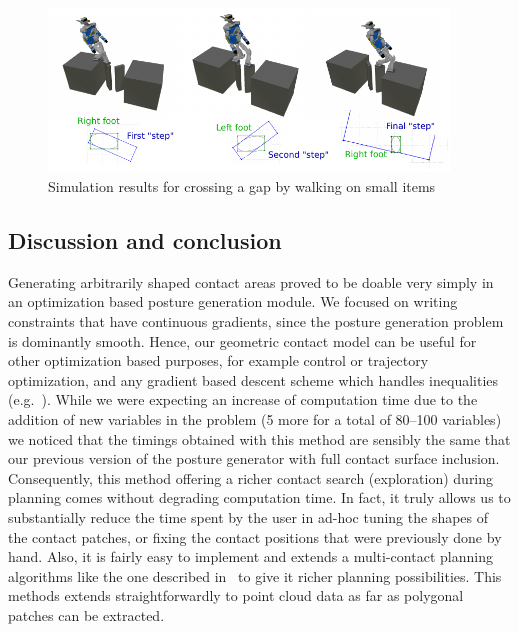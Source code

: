 \begin{figure}[!htb]
  \centering
  \includegraphics[width=0.95\textwidth]{riviere3steps.pdf}
  \caption{Simulation results for crossing a gap by walking on small items}
\label{fig:riviere}
\end{figure}



\subsection{Discussion and conclusion}


Generating arbitrarily shaped contact areas proved to be doable very simply in an optimization based posture generation module.
We focused on writing constraints that have continuous gradients, since the posture generation problem is dominantly smooth.
Hence, our geometric contact model can be useful for other optimization based purposes, for example control or trajectory optimization, and any gradient based descent scheme which handles inequalities (e.g.~\cite{escande:icra:2010}).
While we were expecting an increase of computation time due to the addition of new variables in the problem (5 more for a total of 80--100 variables)
we noticed that the timings obtained with this method are sensibly the same that our previous version of the posture generator with full contact surface inclusion.
Consequently, this method offering a richer contact search (exploration) during planning comes without degrading computation time.
In fact, it truly allows us to substantially reduce the time spent by the user in ad-hoc tuning the shapes of the contact patches, or fixing the contact positions that were previously done by hand.
Also, it is fairly easy to implement and extends a multi-contact planning algorithms like the one described in~\cite{escande:ras:2013}{} to give it richer planning possibilities.
This methods extends straightforwardly to point cloud data as far as polygonal patches can be extracted.

